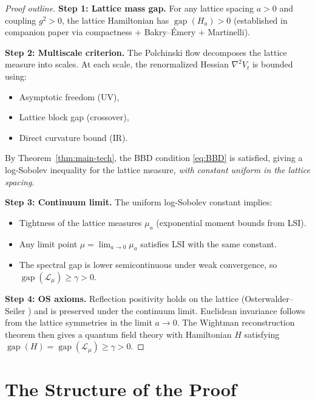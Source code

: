 \documentclass[11pt,a4paper]{article}
\theoremstyle{plain}
\theoremstyle{definition}
\theoremstyle{remark}
\newcommand{\cL}{\mathcal{L}}
\newcommand{\gap}{\operatorname{gap}}
\begin{document}
\begin{proof}[Proof outline]
\textbf{Step 1: Lattice mass gap.}
For any lattice spacing $a > 0$ and coupling $g^2 > 0$, the
lattice Hamiltonian has $\gap(H_a) > 0$ (established in
companion paper via compactness + Bakry--\'Emery + Martinelli).

\textbf{Step 2: Multiscale criterion.}
The Polchinski flow decomposes the lattice measure into scales.
At each scale, the renormalized Hessian $\nabla^2 V_t$ is
bounded using:
\begin{itemize}[nosep]
\item Asymptotic freedom (UV),
\item Lattice block gap (crossover),
\item Direct curvature bound (IR).
\end{itemize}
By Theorem~\ref{thm:main-tech}, the BBD condition \eqref{eq:BBD}
is satisfied, giving a log-Sobolev inequality for the lattice
measure, \emph{with constant uniform in the lattice spacing}.

\textbf{Step 3: Continuum limit.}
The uniform log-Sobolev constant implies:
\begin{itemize}[nosep]
\item Tightness of the lattice measures $\mu_a$ (exponential
  moment bounds from LSI).
\item Any limit point $\mu = \lim_{a \to 0} \mu_a$ satisfies
  LSI with the same constant.
\item The spectral gap is lower semicontinuous under weak
  convergence, so $\gap(\cL_\mu) \ge \gamma > 0$.
\end{itemize}

\textbf{Step 4: OS axioms.}
Reflection positivity holds on the lattice (Osterwalder--Seiler
\cite{OS1978}) and is preserved under the continuum limit.
Euclidean invariance follows from the lattice symmetries in the
limit $a \to 0$. The Wightman reconstruction theorem then gives
a quantum field theory with Hamiltonian $H$ satisfying
$\gap(H) = \gap(\cL_\mu) \ge \gamma > 0$.
\end{proof}

\section{The Structure of the Proof}
\end{document}

